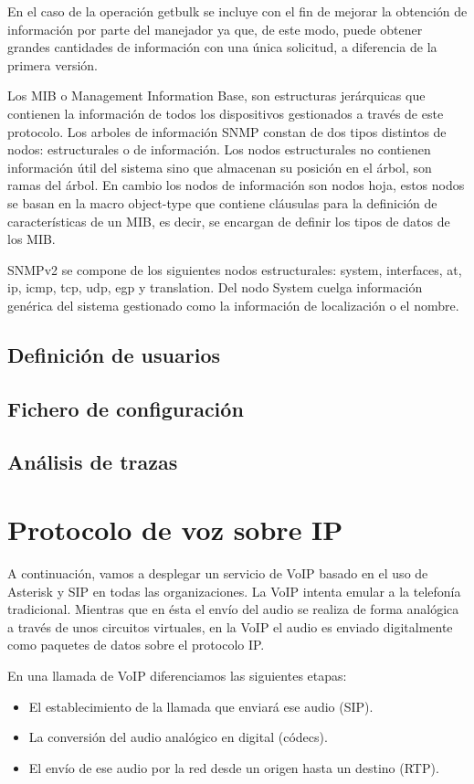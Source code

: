\documentclass[a4paper]{article}
\begin{document}
\medskip
\noindent En el caso de la operación getbulk se incluye con el fin de mejorar la obtención de información por parte del manejador ya que, de este modo, puede obtener grandes cantidades de información con una única solicitud, a diferencia de la primera versión.

\medskip
\noindent Los MIB o Management Information Base, son estructuras jerárquicas que contienen la información de todos los dispositivos gestionados a través de este protocolo. Los arboles de información SNMP constan de dos tipos distintos de nodos: estructurales o de información. Los nodos estructurales no contienen información útil del sistema sino que almacenan su posición en el árbol, son ramas del árbol. En cambio los nodos de información son nodos hoja, estos nodos se basan en la macro object-type que contiene cláusulas para la definición de características de un MIB, es decir, se encargan de definir los tipos de datos de los MIB.

\medskip
\noindent SNMPv2 se compone de los siguientes nodos estructurales: system, interfaces, at, ip, icmp, tcp, udp, egp y translation.
Del nodo System cuelga información genérica del sistema gestionado como la información de localización o el nombre. 

\subsection{Definición de usuarios}
\subsection{Fichero de configuración}
\subsection{Análisis de trazas}

\newpage
\section{Protocolo de voz sobre IP}

A continuación, vamos a desplegar un servicio de VoIP basado en el uso de Asterisk y SIP en todas las organizaciones.
La VoIP intenta emular a la telefonía tradicional. Mientras que en ésta el envío del audio se realiza de forma analógica a través de unos circuitos virtuales, en la VoIP el audio es enviado digitalmente como paquetes de datos sobre el protocolo IP.

\medskip
\noindent En una llamada de VoIP diferenciamos las siguientes etapas:
\begin{itemize}
    \item El establecimiento de la llamada que enviará ese audio (SIP).
    \item La conversión del audio analógico en digital (códecs).
    \item El envío de ese audio por la red desde un origen hasta un destino (RTP).

\end{itemize}
\end{document}
